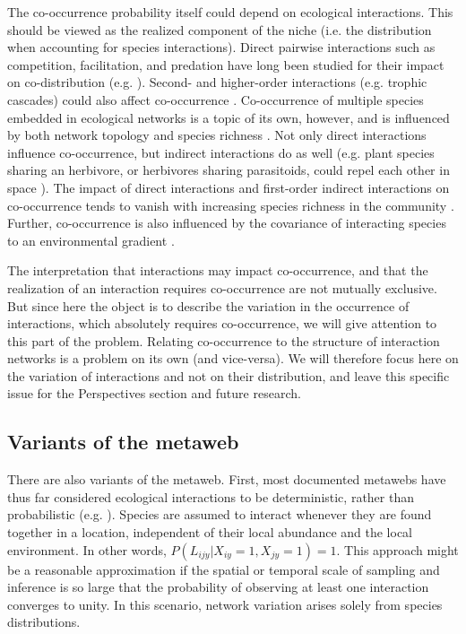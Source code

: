 \documentclass[12pt]{article}
\begin{document}
The co-occurrence probability itself could depend on ecological interactions. 
This should be viewed as the realized component of the niche (i.e. the
distribution when accounting for species interactions). Direct pairwise
interactions such as competition, facilitation, and predation have long been
studied for their impact on co-distribution (e.g. \citealt{Diamond1975,
Connor1979, Gotelli2000}). Second- and higher-order interactions (e.g. trophic
cascades) could also affect co-occurrence \citep{Harris2016,
Staniczenko2017}. Co-occurrence of multiple species embedded in ecological
networks is a topic of its own, however, and is influenced by both network
topology and species richness \citep{Cazelles2016}. Not only direct
interactions influence co-occurrence, but indirect interactions do as well
(e.g. plant species sharing an herbivore, or herbivores sharing parasitoids,
could repel each other in space \citep{Holt1993}). The impact of direct
interactions and first-order indirect interactions on co-occurrence tends to
vanish with increasing species richness in the community \citep{Cazelles2016}.
Further, co-occurrence is also influenced by the covariance of interacting
species to an environmental gradient \citep{Cazelles2015}. 

The interpretation that interactions may impact co-occurrence, and that the
realization of an interaction requires co-occurrence are not mutually
exclusive. But since here the object is to describe the variation in the
occurrence of interactions, which absolutely requires co-occurrence, we will
give attention to this part of the problem. Relating co-occurrence to the
structure of interaction networks is a problem on its own (and vice-versa). We
will therefore focus here on the variation of interactions and not on their
distribution, and leave this specific issue for the Perspectives section and
future research.

\subsection*{Variants of the metaweb}

There are also variants of the metaweb. First, most documented metawebs have
thus far considered ecological interactions to be deterministic, rather than
probabilistic (e.g. \citealt{Havens1992, Wood2015}). Species are assumed to
interact whenever they are found together in a location, independent of their
local abundance and the local environment. In other words,
$P(L_{ijy}|X_{iy}=1,X_{jy}=1) = 1$. This approach might be a reasonable
approximation if the spatial or temporal scale of sampling and inference is so
large that the probability of observing at least one interaction converges to
unity. In this scenario, network variation arises solely from species
distributions.
\end{document}
